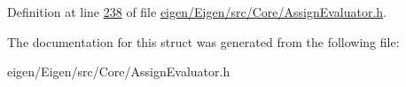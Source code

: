 Definition at line \hyperlink{eigen_2_eigen_2src_2_core_2_assign_evaluator_8h_source_l00238}{238} of file \hyperlink{eigen_2_eigen_2src_2_core_2_assign_evaluator_8h_source}{eigen/\+Eigen/src/\+Core/\+Assign\+Evaluator.\+h}.



The documentation for this struct was generated from the following file\+:\begin{DoxyCompactItemize}
\item 
eigen/\+Eigen/src/\+Core/\+Assign\+Evaluator.\+h\end{DoxyCompactItemize}
